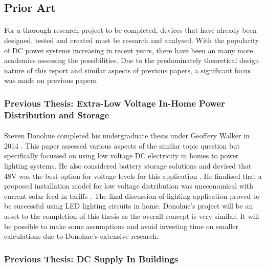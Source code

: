 
\subsection{Prior Art}

\paragraph{}
For a thorough research project to be completed, devices that have already been designed, tested and created must be research and analysed. With the popularity of DC power systems increasing in recent years, there have been an many more academics assessing the possibilities. Due to the predominately theoretical design nature of this report and similar aspects of previous papers, a significant focus was made on previous papers.  

\subsubsection{Previous Thesis: Extra-Low Voltage In-Home Power Distribution and Storage}

\paragraph{}
Steven Donohue completed his undergraduate thesis under Geoffery Walker in 2014 \cite{Donohue2014}. This paper assessed various aspects of the similar topic question but specifically focussed on using low voltage DC electricity in homes to power lighting systems. He also considered battery storage solutions and devised that 48V was the best option for voltage levels for this application \cite{Donohue2014}. He finalised that a proposed installation model for low voltage distribution was uneconomical with current solar feed-in tariffs \cite{Donohue2014}. The final discussion of lighting application proved to be successful using LED lighting circuits in home. Donohue's project will be an asset to the completion of this thesis as the overall concept is very similar. It will be possible to make some assumptions and avoid investing time on smaller calculations due to Donohue's extensive research.         

\subsubsection{Previous Thesis: DC Supply In Buildings}

